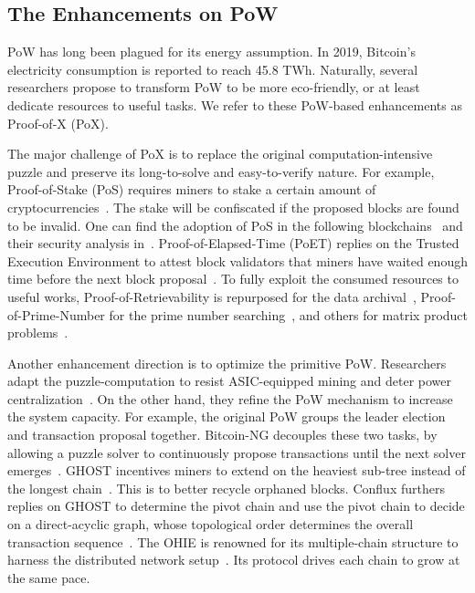 \subsection{The Enhancements on PoW}
PoW has long been plagued for its energy assumption. 
In 2019, Bitcoin's electricity consumption is reported to reach 45.8 TWh. 
Naturally, several researchers propose to transform PoW to be more eco-friendly, 
or at least dedicate resources to useful tasks. 
We refer to these PoW-based enhancements as Proof-of-X (PoX). 

The major challenge of PoX is to replace the original computation-intensive puzzle and preserve its long-to-solve and easy-to-verify nature. 
For example, Proof-of-Stake (PoS) requires miners to stake a certain amount of cryptocurrencies~\cite{king2012ppcoin}. 
The stake will be confiscated if the proposed blocks are found to be invalid. 
One can find the adoption of PoS in the following blockchains~\cite{kiayias2017ouroboros,david2018ouroboros,bentov2016snow} and their security analysis in~\cite{nguyen2019proof,li2017securing,brown2019formal}. 
Proof-of-Elapsed-Time (PoET) replies on the Trusted Execution Environment to attest block validators that miners have waited enough time before the next block proposal~\cite{chen2017security}. 
To fully exploit the consumed resources to useful works, 
Proof-of-Retrievability is repurposed for the data archival~\cite{miller2014permacoin}, Proof-of-Prime-Number for the prime number searching~\cite{king2013primecoin}, and others for matrix product problems~\cite{shoker2017sustainable}. 

Another enhancement direction is to optimize the primitive PoW. 
Researchers adapt the puzzle-computation to resist ASIC-equipped mining and deter power centralization~\cite{zamanov2018asic,cho2018asic}. 
On the other hand, they refine the PoW mechanism to increase the system capacity.
For example, the original PoW groups the leader election and transaction proposal together. 
Bitcoin-NG decouples these two tasks, by allowing a puzzle solver to continuously propose transactions until the next solver emerges~\cite{eyal2016bitcoin}. 
GHOST incentives miners to extend on the heaviest sub-tree instead of the longest chain~\cite{sompolinsky2015secure}. 
This is to better recycle orphaned blocks. 
Conflux furthers replies on GHOST to determine the pivot chain and use the pivot chain to decide on a direct-acyclic graph, whose topological order determines the overall transaction sequence~\cite{li2018scaling}. 
The OHIE is renowned for its multiple-chain structure to harness the distributed network setup~\cite{yu2020ohie}. 
Its protocol drives each chain to grow at the same pace. 

